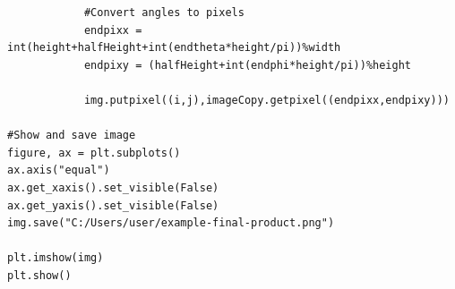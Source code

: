 \documentclass[oneside,openright,frontopenright, singlespacing]{dmathesis}
\begin{document}
\begin{lstlisting}
            #Convert angles to pixels
            endpixx = int(height+halfHeight+int(endtheta*height/pi))%width
            endpixy = (halfHeight+int(endphi*height/pi))%height

            img.putpixel((i,j),imageCopy.getpixel((endpixx,endpixy)))
            
#Show and save image
figure, ax = plt.subplots()
ax.axis("equal")
ax.get_xaxis().set_visible(False)
ax.get_yaxis().set_visible(False)
img.save("C:/Users/user/example-final-product.png")        

plt.imshow(img)
plt.show()
\end{lstlisting}





%

{}
\end{document}
